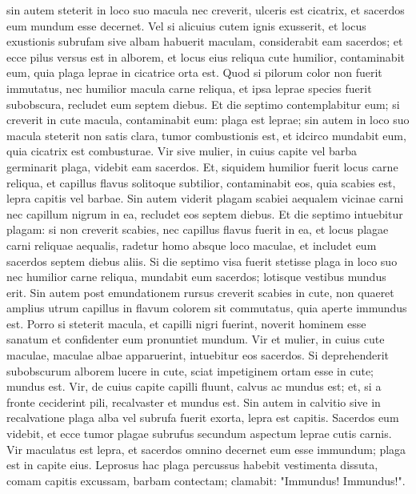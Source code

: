 \begin{biblechapter}
\begin{biblechapter}
\begin{biblechapter}
\begin{biblechapter}
\begin{biblechapter}
\begin{biblechapter}
\begin{biblechapter}
\begin{biblechapter}
\begin{biblechapter}
\begin{biblechapter}
\begin{biblechapter}
\begin{biblechapter}
\begin{biblechapter}
\verse sin autem steterit in loco suo macula nec creverit, ulceris est cicatrix, et sacerdos eum mundum esse decernet.
 \verse Vel si alicuius cutem ignis exusserit, et locus exustionis subrufam sive albam habuerit maculam, 
\verse considerabit eam sacerdos; et ecce pilus versus est in alborem, et locus eius reliqua cute humilior, contaminabit eum, quia plaga leprae in cicatrice orta est. 
\verse Quod si pilorum color non fuerit immutatus, nec humilior macula carne reliqua, et ipsa leprae species fuerit subobscura, recludet eum septem diebus. 
\verse Et die septimo contemplabitur eum; si creverit in cute macula, contaminabit eum: plaga est leprae; 
\verse sin autem in loco suo macula steterit non satis clara, tumor combustionis est, et idcirco mundabit eum, quia cicatrix est combusturae.
 \verse Vir sive mulier, in cuius capite vel barba germinarit plaga, videbit eam sacerdos. 
\verse Et, siquidem humilior fuerit locus carne reliqua, et capillus flavus solitoque subtilior, contaminabit eos, quia scabies est, lepra capitis vel barbae. 
\verse Sin autem viderit plagam scabiei aequalem vicinae carni nec capillum nigrum in ea, recludet eos septem diebus. 
\verse Et die septimo intuebitur plagam: si non creverit scabies, nec capillus flavus fuerit in ea, et locus plagae carni reliquae aequalis, 
\verse radetur homo absque loco maculae, et includet eum sacerdos septem diebus aliis. 
\verse Si die septimo visa fuerit stetisse plaga in loco suo nec humilior carne reliqua, mundabit eum sacerdos; lotisque vestibus mundus erit. 
\verse Sin autem post emundationem rursus creverit scabies in cute, 
\verse non quaeret amplius utrum capillus in flavum colorem sit commutatus, quia aperte immundus est. 
\verse Porro si steterit macula, et capilli nigri fuerint, noverit hominem esse sanatum et confidenter eum pronuntiet mundum.
 \verse Vir et mulier, in cuius cute maculae, maculae albae apparuerint, 
\verse intuebitur eos sacerdos. Si deprehenderit subobscurum alborem lucere in cute, sciat impetiginem ortam esse in cute; mundus est.
 \verse Vir, de cuius capite capilli fluunt, calvus ac mundus est; 
\verse et, si a fronte ceciderint pili, recalvaster et mundus est. 
\verse Sin autem in calvitio sive in recalvatione plaga alba vel subrufa fuerit exorta, lepra est capitis. 
 \verse Sacerdos eum videbit, et ecce tumor plagae subrufus secundum aspectum leprae cutis carnis. 
\verse Vir maculatus est lepra, et sacerdos omnino decernet eum esse immundum; plaga est in capite eius.
 \verse Leprosus hac plaga percussus habebit vestimenta dissuta, comam capitis excussam, barbam contectam; clamabit: "Immundus! Immundus!". 

\end{biblechapter}
\end{biblechapter}
\end{biblechapter}
\end{biblechapter}
\end{biblechapter}
\end{biblechapter}
\end{biblechapter}
\end{biblechapter}
\end{biblechapter}
\end{biblechapter}
\end{biblechapter}
\end{biblechapter}
\end{biblechapter}
